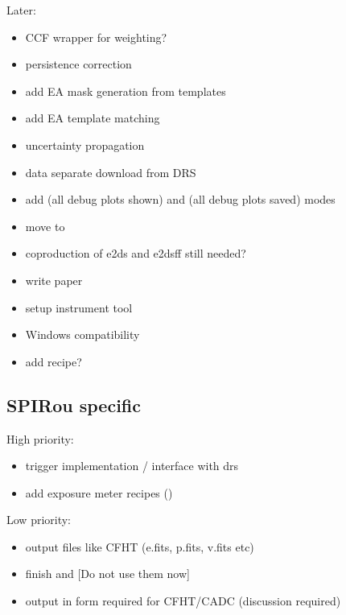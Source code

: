 \documentclass[a4paper,10pt,english]{report}
\begin{document}
Later:
\begin{itemize}
\item {} 
CCF wrapper for weighting?

\item {} 
persistence correction

\item {} 
add EA mask generation from templates

\item {} 
add EA template matching

\item {} 
uncertainty propagation

\item {} 
data separate download from DRS

\item {} 
add  (all debug plots shown) and  (all debug plots saved) modes

\item {} 
move  to 

\item {} 
co\sphinxhyphen{}production of e2ds and e2dsff still needed?

\item {} 
write  paper

\item {} 
setup instrument tool

\item {} 
Windows compatibility

\item {} 
add  recipe?

\end{itemize}


\subsection{SPIRou specific}
\label{\detokenize{user/general/todo:spirou-specific}}
High priority:
\begin{itemize}
\item {} 
trigger implementation / interface with drs

\item {} 
add exposure meter recipes ()

\end{itemize}

Low priority:
\begin{itemize}
\item {} 
output files like CFHT (e.fits, p.fits, v.fits etc)

\item {} 
finish  and  {[}Do not use them now{]}

\item {} 
output in form required for CFHT/CADC (discussion required)

\end{itemize}
\end{document}

